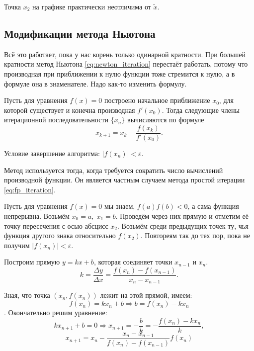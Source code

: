\documentclass[../main.tex]{subfile}
\begin{document}
\begin{example}

	Точка $x_2$ на графике практически неотличима от $\widetilde{x}$.

\end{example}

\subsection{Модификации метода Ньютона}

Всё это работает, пока у нас корень только одинарной кратности. При большей
кратности метод Ньютона \eqref{eq:newton_iteration} перестаёт работать, потому
что производная при приближении к нулю функции тоже стремится к нулю, а в
формуле она в знаменателе. Надо как-то изменить формулу.

\begin{algorithm}
	Пусть для уравнения $f(x)=0$ построено начальное приближение $x_0$, для
	которой существует и конечна производная $f'(x_0)$. Тогда следующие
	члены итерационной последовательности $\{x_n\}$ вычисляются по формуле
	\[\boxed{x_{k+1}=x_k-\frac{f(x_k)}{f'(x_0)}}.\]

	Условие завершение алгоритма: $|f(x_n)|<\varepsilon$.

	Метод используется тогда, когда требуется сократить число вычислений
	производной функции. Он является частным случаем метода простой
	итерации \eqref{eq:fp_iteration}.
\end{algorithm}

\begin{algorithm}
	Пусть для уравнения $f(x)=0$ мы знаем, $f(a)f(b)<0$, а сама функция
	непрерывна. Возьмём $x_0=a,\;x_1=b$. Проведём через них прямую и отметим
	её точку пересечения с осью абсцисс $x_2$. Возьмём среди предыдущих
	точек ту, чья функция другого знака относительно $f(x_2)$. Повтореям так
	до тех пор, пока не получим $|f(x_n)|<\varepsilon$.

	Построим прямую $y=kx+b$, которая соединяет точки $x_{n-1}$ и $x_n$.
	\[k=\frac{\Delta y}{\Delta x}=\frac{f(x_n)-f(x_{n-1})}{x_n-x_{n-1}}.\]

	Зная, что точка $(x_n,f(x_n))$ лежит на этой прямой, имеем:
	\[f(x_n)=kx_n+b\Rightarrow b=f(x_n)-kx_n\].
	Окончательно решим уравнение:
	\[kx_{n+1}+b=0\Rightarrow x_{n+1}=-\frac{b}{k}=-\frac{f(x_n)-kx_n}{k},\]
	\[\boxed{x_{n+1}=x_n-\frac{x_n-x_{n-1}}{f(x_n)-f(x_{n-1})}f(x_n)}\]
\end{algorithm}
\end{document}
